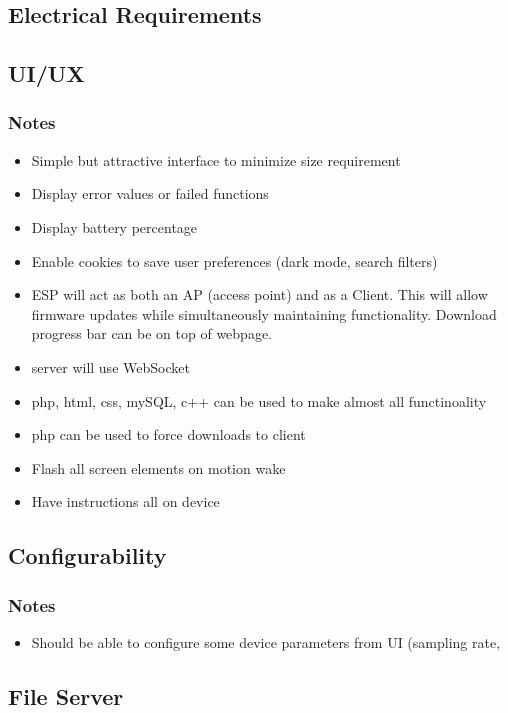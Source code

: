 \documentclass{article}
\begin{document}
\subsection{Electrical Requirements}



\subsection{UI/UX}
\subsubsection{Notes}
\begin{itemize}
    \item Simple but attractive interface to minimize size requirement
    \item Display error values or failed functions
    \item Display battery percentage
    \item Enable cookies to save user preferences (dark mode, search filters)
    \item ESP will act as both an AP (access point) and as a Client. This will allow firmware updates while simultaneously maintaining functionality. Download progress bar can be on top of webpage.
    \item server will use WebSocket
    \item php, html, css, mySQL, c++ can be used to make almost all functinoality
    \item php can be used to force downloads to client
    \item Flash all screen elements on motion wake
    \item Have instructions all on device
\end{itemize}


\subsection{Configurability}
\subsubsection{Notes}
\begin{itemize}
    \item Should be able to configure some device parameters from UI (sampling rate, 
\end{itemize}


\subsection{File Server}
\end{document}
